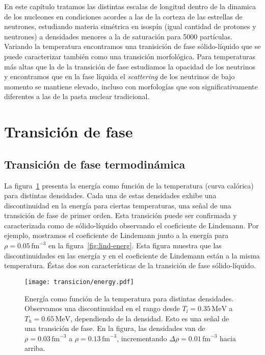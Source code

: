En este capítulo tratamos las distintas escalas de longitud dentro de
la dinamica de los nucleones en condiciones acordes a las de la corteza de las estrellas de neutrones, estudiando materia simétrica en isospín (igual cantidad de protones y neutrones) a densidades menores a la de saturación para 5000 partículas.
Variando la temperatura encontramos una tranisición de fase sólido-líquido que se puede caracterizar también como una transición morfológica.
Para temperaturas más altas que la de la transición de fase estudiamos la opacidad de los neutrinos y encontramos que en la fase líquida el \emph{scattering} de los neutrinos de bajo momento se mantiene elevado, incluso con morfologías que son significativamente diferentes a las de la pasta nuclear tradicional.
\section{Transición de fase}
\label{phase_transition}
\subsection{Transición de fase termodinámica}

La figura~\ref{fig:energy} presenta la energía como función de la temperatura (curva calórica) para distintas densidades.
Cada una de estas densidades exhibe una discontinuidad en la energía para ciertas temperaturas, una señal de una transición de fase de primer orden.
Esta transición puede ser confirmada y caracterizada como de sólido-líquido observando el coeficiente de Lindemann. Por ejemplo, mostramos el coeficiente de Lindemann junto a la energía para $\rho=0.05\,\text{fm}^{-3}$ en la figura~\ref{fig:lind-energ}.
Esta figura muestra que las discontinuidades en las energía y en el coeficiente de Lindemann están a la misma temperatura.
Éstas dos son características de la transición de fase sólido-líquido.

\begin{figure}[h!]  \centering
\texttt{[image: transicion/energy.pdf]}
\caption{Energía como función de la temperatura para distintas densidades.
  Observamos una discontinuidad en el rango desde $T_l=0.35\,\text{MeV}$ a $T_h=0.65\,\text{MeV}$, dependiendo de la densidad.
  Esto es una señal de una transición de fase.
  En la figura, las densidades van de $\rho=0.03\,\text{fm}^{-3}$ a $\rho=0.13\,\text{fm}^{-3}$, incrementando $\Delta\rho=0.01\,\text{fm}^{-3}$ hacia arriba.}
\label{fig:energy}
\end{figure}

